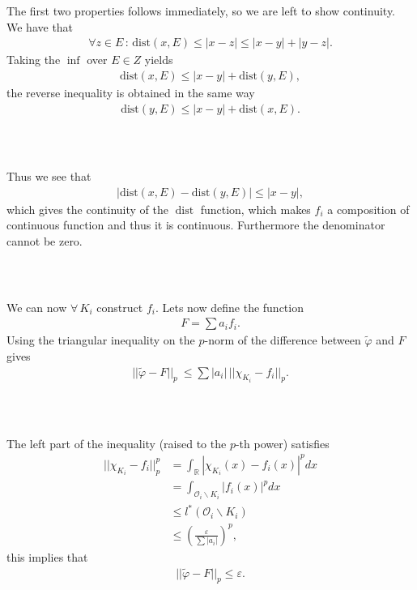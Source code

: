 \documentclass{beamer}
\numberwithin{equation}{section}
\DeclareMathOperator{\dist}{dist}
\begin{document}
\begin{frame}\frametitle{{\normalsize \secname} \\ {\large \subsecname}}
    The first two properties follows immediately, so we are left to show continuity.
    We have that
    \begin{align}
        \forall z \in E \, : \, \text{dist}(x, E) \leq |x-z|\leq |x-y|+|y-z|.
    \end{align}
    Taking the $\inf$ over $E \in Z$ yields
    \begin{align}
        \text{dist}(x, E)\leq |x-y|+\text{dist}(y, E),
    \end{align}
    the reverse inequality is obtained in the same way
    \begin{align}
        \text{dist}(y, E)\leq |x-y|+\text{dist}(x, E).
    \end{align}
\end{frame}

\begin{frame}\frametitle{{\normalsize \secname} \\ {\large \subsecname}}
    Thus we see that
    \begin{align*}
        |\text{dist}(x, E)-\text{dist}(y, E)|\leq |x-y|,
    \end{align*}
    which gives the continuity of the $\dist$ function, which makes $f_i$ a composition of continuous function and thus it is continuous.
    Furthermore the denominator cannot be zero.
\end{frame}

\begin{frame}\frametitle{{\normalsize \secname} \\ {\large \subsecname}}
    We can now $\forall \, K_i$ construct $f_i$.
    Lets now define the function
    \begin{align}
        F = \sum a_i f_i.
    \end{align}
    Using the triangular inequality on the $p$-norm of the difference between $\tilde{\varphi}$ and $F$ gives
    \begin{align}
        ||\tilde{\varphi}-F ||_p \ \leq  \sum |a_i| \, ||\chi_{K_i}-f_i ||_p.
    \end{align}
\end{frame}

\begin{frame}\frametitle{{\normalsize \secname} \\ {\large \subsecname}}
    The left part of the inequality (raised to the $p$-th power) satisfies
    \begin{align}
        ||\chi_{K_i} - f_i ||_p^p &= \int_{\mathbb{R}} | \chi_{K_i}(x) - f_i (x)|^p dx\\
         &= \int_{\mathcal{O}_i \backslash K_i} |f_i (x)|^p dx \\
         &\leq l^*(\mathcal{O}_i \backslash K_i) \\
         &\leq \left(\frac{\varepsilon}{\sum| a_i|}\right)^p,
    \end{align}
    this implies that
    \begin{align}
        ||\tilde{\varphi} - F||_p \leq \varepsilon.
    \end{align}
\end{frame}
\end{document}
